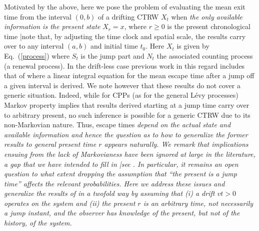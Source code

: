 \documentclass[english,aps,a4paper,twocolumn,showpacs,showkeys,amsfonts,amsmath,amssymb,amscd,nofootinbib]{revtex4}
\newcommand{\1}{\'\i}
\begin{document}
Motivated by the above,
here we pose the problem of evaluating  the mean exit time from
the  interval %
$(0,b)$ of a drifting CTRW $X_t$ when {\it the only available information is the present state\/} $X_r=x$, where $r \geqslant 0$ is the present chronological time 
|note that, by
adjusting the time clock and spatial scale, the results carry
over to any interval $(a,b)$ and initial time $t_0$. Here
$X_t$ is given by Eq.~(\ref{process}) where %
$S_t$ is the jump part and $N_t$
the associated counting process (a renewal
    process).    In the drift-less case previous work in this regard includes that
of \cite{mmp05,mmpw06} where  a linear integral equation for the
mean escape time after a jump off a given interval is derived. We
note however that these
 results  do not cover a generic situation. Indeed, while  for
CPPs (as  for  the  general  L\'evy processes) Markov property
implies that results derived starting at a jump time carry over
to arbitrary present, no such inference is possible for a generic
CTRW  due to its non-Markovian nature. Thus, escape times \it
depend on the actual state and available information \rm and
hence  the question as to how to generalize the former results to
\it general present time \rm $r$ appears naturally. We remark that
 implications  ensuing from the lack of
 Markovianess
 have been      ignored at large in the literature, a gap that we
  have intended  to fill in |see \cite{VM2}.   In particular, it  remains
 an open
question  to what extent  dropping   the assumption  that ``the
present is a jump
   time'' affects  the relevant probabilities.
 Here  we address these issues      and
generalize the  results of  \cite{mmp05,mmpw06} in a twofold way
by assuming  that   (i) a drift $vt>0$ operates on the system and
(ii) the present $r$ is an arbitrary   time,    not necessarily a
jump instant, and the observer \it  has  knowledge of the present,
but not of  the history, of the system\rm.
\end{document}
